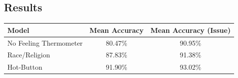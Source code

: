 \documentclass[a0,portrait]{a0poster}
\begin{document}
\begin{multicols}{2}
\section*{Results}
\vspace{-1cm}
\begin{center}
  {\renewcommand{\arraystretch}{1.2}
  \begin{tabular}{|l|c|c|} \hline
    \textbf{Model} & \textbf{Mean Accuracy} & \textbf{Mean Accuracy (Issue)} \\ \hline
    No Feeling Thermometer & 80.47\% & 90.95\% \\ \hline
    {\color{DarkMagenta}Race/Religion} & 87.83\% & 91.38\% \\ \hline
    {\color{CornflowerBlue}Hot-Button} & 91.90\% & 93.02\% \\ \hline
  \end{tabular}}
  \label{fig:scores}
\end{center}


\end{multicols}
\end{document}
